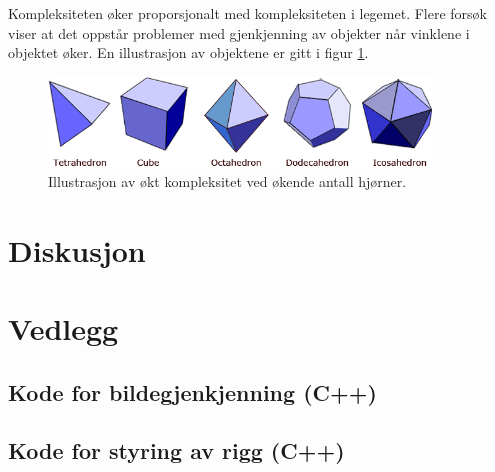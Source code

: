 \documentclass[a4paper, 11pt]{article}
\begin{document}
Kompleksiteten øker proporsjonalt med kompleksiteten i legemet. Flere forsøk viser at det oppstår problemer med gjenkjenning av objekter når vinklene i objektet øker. En illustrasjon av objektene er gitt i figur \ref{fig:platonic}.

\begin{figure}[h]
\centering
\includegraphics[width=4in]{figurer/platonic-solids.gif}
\caption{Illustrasjon av økt kompleksitet ved økende antall hjørner. \cite{platonic} }
\label{fig:platonic}
\end{figure}

 \newpage
\section{Diskusjon}




\newpage



 \newpage
\section{Vedlegg}

\subsection{Kode for bildegjenkjenning (C++)}

\subsection{Kode for styring av rigg (C++)}
\end{document}
